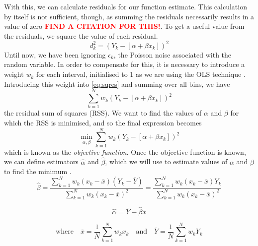 \documentclass[a4paper,11pt]{article}
\begin{document}
    With this, we can calculate residuals for our function estimate. This
    calculation by itself is not sufficient, though, as summing the residuals
    necessarily results in a value of zero \textcolor{red}{\textbf{FIND A CITATION FOR THIS!}}. To
    get a useful value from the residuals, we square the value of each residual.
    \begin{equation}\label{eq:sqres}
    d_k^2=(Y_k-[\alpha +\beta x_k])^2
    \end{equation}
    Until now, we have been ignoring ${\epsilon}_k$, the Poisson noise associated
    with the random variable. In order to compensate for this, it is necessary to
    introduce a weight $w_k$ for each interval, initialised to 1 as we are using
    the OLS technique \cite{massey1996estimating}. Introducing this weight into
    \eqref{eq:sqres} and summing over all bins, we have
    \begin{equation}
    \sum_{k=1}^N w_k(Y_k-[\alpha +\beta x_k])^2
    \end{equation}
    the residual sum of squares (RSS). We want to find the values of $\alpha$ and
    $\beta$ for which the RSS is minimised, and so the final expression becomes
    \begin{equation}
    \min_{\alpha,\beta}\sum_{k=1}^N w_k(Y_k-[\alpha +\beta x_k])^2
    \end{equation}
    which is known as the \emph{objective function}. Once the objective function is
    known, we can define estimators $\hat{\alpha}$ and $\hat{\beta}$, which we
    will use to estimate values of $\alpha$ and $\beta$ to find the minimum \cite{massey1996estimating}.
    \begin{equation}
    \hat{\beta}
    =\frac{\displaystyle\sum_{k=1}^N w_k(x_k-\bar{x})(Y_k-\bar{Y})}{\displaystyle \sum_{k=1}^N w_k(x_k-\bar{x})^2}
    =\frac{\displaystyle\sum_{k=1}^N w_k(x_k-\bar{x})Y_k}{\displaystyle\sum_{k=1}^N w_k(x_k-\bar{x})^2}
    \end{equation}

    \begin{equation}
    \hat{\alpha}=\bar{Y}-\hat{\beta}\bar{x}
    \end{equation}

    \begin{equation}
    \text{where}\quad
    \bar{x}=\frac{1}{N}\sum_{k=1}^N w_kx_k\quad \text{and}\quad
    \bar{Y}=\frac{1}{N}\sum_{k=1}^N w_kY_k
    \end{equation}
\end{document}
